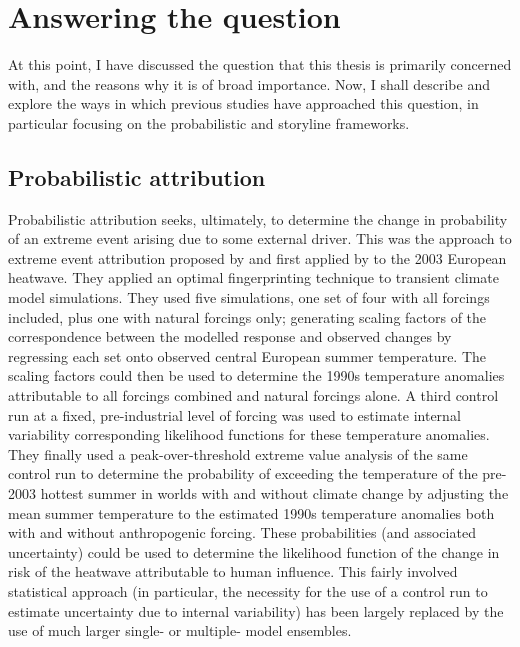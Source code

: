 \section{Answering the question}

  At this point, I have discussed the question that this thesis is primarily concerned with, and the reasons why it is of broad importance. Now, I shall describe and explore the ways in which previous studies have approached this question, in particular focusing on the probabilistic \citep[often ``conventional'',][]{stott_human_2004} and storyline \citep{hoerling_anatomy_2013} frameworks. 

  \subsection{Probabilistic attribution}

    Probabilistic attribution seeks, ultimately, to determine the change in probability of an extreme event arising due to some external driver. This was the approach to extreme event attribution proposed by \citet{allen_liability_2003} and first applied by \citet{stott_human_2004} to the 2003 European heatwave. They applied an optimal fingerprinting technique \citep{hasselmann_optimal_1993,hasselmann_multi-pattern_1997} to transient climate model simulations. They used five simulations, one set of four with all forcings included, plus one with natural forcings only; generating scaling factors of the correspondence between the modelled response and observed changes by regressing each set onto observed central European summer temperature. The scaling factors could then be used to determine the 1990s temperature anomalies attributable to all forcings combined and natural forcings alone. A third control run at a fixed, pre-industrial level of forcing was used to estimate internal variability corresponding likelihood functions for these temperature anomalies. They finally used a peak-over-threshold extreme value analysis of the same control run to determine the probability of exceeding the temperature of the pre-2003 hottest summer in worlds with and without climate change by adjusting the mean summer temperature to the estimated 1990s temperature anomalies both with and without anthropogenic forcing. These probabilities (and associated uncertainty) could be used to determine the likelihood function of the change in risk of the heatwave attributable to human influence. This fairly involved statistical approach (in particular, the necessity for the use of a control run to estimate uncertainty due to internal variability) has been largely replaced by the use of much larger single- or multiple- model ensembles.

